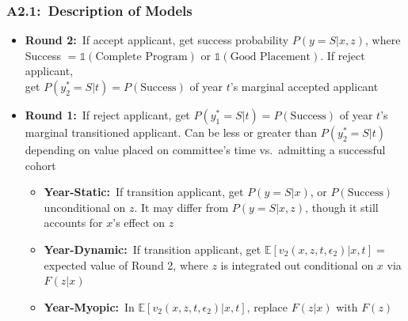 \documentclass[12pt, aspectratio=169]{beamer}
\begin{document}
\begin{frame}[label=dom]
\frametitle{A2.1:\ Description of Models}
\begin{itemize}
\item \textbf{Round 2:}\ If accept applicant, get success probability $P(y=S|x,z)$, where \\ Success $= \mathds{1}(\text{Complete Program})$ or $\mathds{1}(\text{Good Placement})$. If reject applicant, \\ get $P(y_2^*=S|t) = P(\text{Success})$ of year $t$'s marginal accepted applicant
\vspace{10pt}
\item \textbf{Round 1:}\ If reject applicant, get $P(y_1^*=S|t) = P(\text{Success})$ of year $t$'s marginal transitioned applicant. Can be less or greater than $P(y_2^*=S|t)$ depending on value placed on committee's time vs.\ admitting a successful cohort
\vspace{5pt}
\begin{itemize}
\item \textbf{Year-Static:}\ If transition applicant, get $P(y=S|x)$, or $P(\text{Success})$ unconditional on $z$. It may differ from $P(y=S|x,z)$, though it still accounts for $x$'s effect on $z$
\vspace{5pt}
\item \textbf{Year-Dynamic:}\ If transition applicant, get $\mathbb{E}[v_2(x,z,t,\epsilon_2)|x,t]=$ expected value of Round 2, where $z$ is integrated out conditional on $x$ via $F(z|x)$
\vspace{5pt}
\item \textbf{Year-Myopic:}\ In $\mathbb{E}[v_2(x,z,t,\epsilon_2)|x,t]$, replace $F(z|x)$ with $F(z)$
\vspace{10pt}
\end{itemize}
\end{itemize}
\hyperlink{crp}{}
\end{frame}
\end{document}
